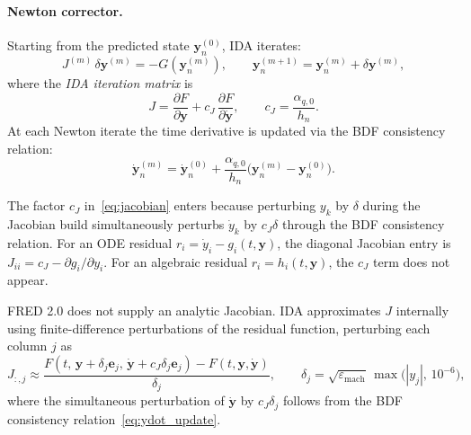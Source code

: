\begin{refsection}
\paragraph{Newton corrector.} Starting from the predicted state $\mathbf{y}_n^{(0)}$, IDA iterates:
\begin{equation}
  J^{(m)}\,\delta\mathbf{y}^{(m)} = -G\!\left(\mathbf{y}_n^{(m)}\right),
  \qquad
  \mathbf{y}_n^{(m+1)} = \mathbf{y}_n^{(m)} + \delta\mathbf{y}^{(m)},
  \label{eq:newton}
\end{equation}
where the \emph{IDA iteration matrix} is
\begin{equation}
  J = \frac{\partial F}{\partial \mathbf{y}}
    + c_J\,\frac{\partial F}{\partial \dot{\mathbf{y}}},
  \qquad
  c_J = \frac{\alpha_{q,0}}{h_n}.
  \label{eq:jacobian}
\end{equation}
At each Newton iterate the time derivative is updated via the BDF consistency relation:
\begin{equation}
  \dot{\mathbf{y}}_n^{(m)} = \dot{\mathbf{y}}_n^{(0)}
    + \frac{\alpha_{q,0}}{h_n}\bigl(\mathbf{y}_n^{(m)} - \mathbf{y}_n^{(0)}\bigr).
  \label{eq:ydot_update}
\end{equation}

The factor $c_J$ in~\eqref{eq:jacobian} enters because perturbing $y_k$ by $\delta$ during the Jacobian build simultaneously perturbs $\dot{y}_k$ by $c_J\delta$ through the BDF consistency relation.  For an ODE residual $r_i = \dot{y}_i - g_i(t,\mathbf{y})$, the diagonal Jacobian entry is $J_{ii} = c_J - \partial g_i/\partial y_i$.  For an algebraic residual $r_i = h_i(t,\mathbf{y})$, the $c_J$ term does not appear.

FRED 2.0 does not supply an analytic Jacobian.  IDA approximates $J$ internally using finite-difference perturbations of the residual function, perturbing each column $j$ as
\begin{equation}
  J_{:,j} \approx
    \frac{F\!\left(t,\,\mathbf{y}+\delta_j\mathbf{e}_j,\,
                    \dot{\mathbf{y}}+c_J\delta_j\mathbf{e}_j\right)
          - F(t,\mathbf{y},\dot{\mathbf{y}})}{\delta_j},
  \qquad
  \delta_j = \sqrt{\varepsilon_\mathrm{mach}}\,\max\!\bigl(|y_j|,\,10^{-6}\bigr),
  \label{eq:fd_jacobian}
\end{equation}
where the simultaneous perturbation of $\dot{\mathbf{y}}$ by $c_J\delta_j$ follows from the BDF consistency relation~\eqref{eq:ydot_update}.


\end{refsection}

